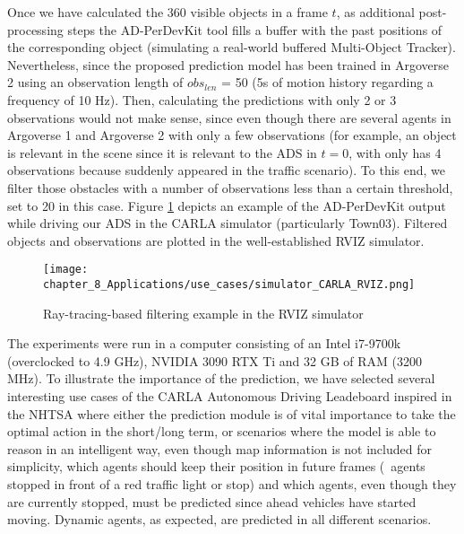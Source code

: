 Once we have calculated the 360 \degree visible objects in a frame $t$, as additional post-processing steps the \ac{AD-PerDevKit} tool fills a buffer with the past positions of the corresponding object (simulating a real-world buffered Multi-Object Tracker). Nevertheless, since the proposed prediction model has been trained in Argoverse 2 using an observation length of \textit{$obs_{len}$} = 50 (\ie 5s of motion history regarding a frequency of 10 Hz). Then, calculating the predictions with only 2 or 3 observations would not make sense, since even though there are several agents in Argoverse 1 and Argoverse 2 with only a few observations (for example, an object is relevant in the scene since it is relevant to the \ac{ADS} in $t=0$, with only has 4 observations because suddenly appeared in the traffic scenario). To this end, we filter those obstacles with a number of observations less than a certain threshold, set to 20 in this case. Figure \ref{fig:chapter_8_Applications/use_cases/simulator_CARLA_RVIZ} depicts an example of the \ac{AD-PerDevKit} output while driving our \ac{ADS} in the \ac{CARLA} simulator (particularly Town03). Filtered objects and observations are plotted in the well-established RVIZ simulator. 

\begin{figure}[!h]
	\centering
	\texttt{[image: chapter\_8\_Applications/use\_cases/simulator\_CARLA\_RVIZ.png]}
	\caption{Ray-tracing-based filtering example in the RVIZ simulator}
	\label{fig:chapter_8_Applications/use_cases/simulator_CARLA_RVIZ}
\end{figure}

The experiments were run in a computer consisting of an Intel i7-9700k (overclocked to 4.9 GHz), NVIDIA 3090 RTX Ti and 32 GB of RAM (3200 MHz). To illustrate the importance of the prediction, we have selected several interesting use cases of the CARLA Autonomous Driving Leadeboard inspired in the \ac{NHTSA} where either the prediction module is of vital importance to take the optimal action in the short/long term, or scenarios where the model is able to reason in an intelligent way, even though map information is not included for simplicity, which agents should keep their position in future frames (\eg \ agents stopped in front of a red traffic light or stop) and which agents, even though they are currently stopped, must be predicted since ahead vehicles have started moving. Dynamic agents, as expected, are predicted in all different scenarios. 

